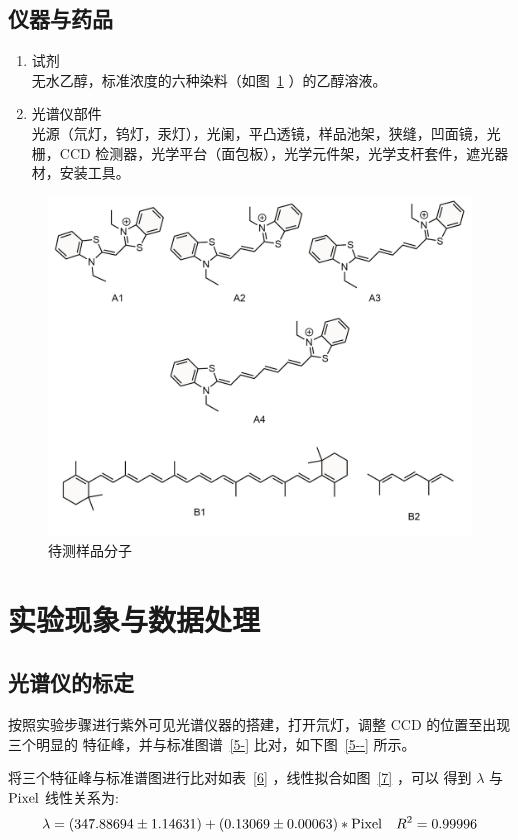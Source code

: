 \documentclass[cn,hazy,pku,12pt,normal,math=newtx,cite=super]{elegantnote}
\begin{document}
\subsection{仪器与药品}

\begin{enumerate} %
    \item 试剂 \\ 无水乙醇，标准浓度的六种染料（如图~\ref{2} ）的乙醇溶液。
    \item 光谱仪部件 \\ 光源（氘灯，钨灯，汞灯），光阑，平凸透镜，样品池架，狭缝，凹面镜，光栅，CCD
    检测器，光学平台（面包板），光学元件架，光学支杆套件，遮光器材，安装工具。
\end{enumerate}


\begin{figure}[htbp]
    \centering
    \includegraphics[width = .60\textwidth]{image/drugs.png}
    \caption{待测样品分子}\label{2}
\end{figure}

\section{实验现象与数据处理}

\subsection{光谱仪的标定}

按照实验步骤进行紫外可见光谱仪器的搭建，打开氘灯，调整 CCD 的位置至出现三个明显的
特征峰，并与标准图谱~\ref{5-} 比对，如下图~\ref{5--} 所示。

将三个特征峰与标准谱图进行比对如表~\ref{6} ，线性拟合如图~\ref{7} ，可以
得到 $\lambda$ 与  $ {\rm Pixel} $ 线性关系为:
\begin{equation}\label{nihe}
    \lambda = (347.88694 \pm  1.14631) + (0.13069 \pm  0.00063) * {\rm Pixel} \quad R^2=0.99996
\end{equation}
\end{document}
